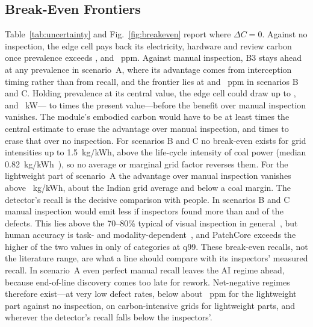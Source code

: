 \subsection{Break-Even Frontiers}
\label{sec:breakeven}
Table~\ref{tab:uncertainty} and Fig.~\ref{fig:breakeven} report where $\Delta C=0$. Against no inspection, the edge cell pays back its electricity, hardware and review carbon once prevalence exceeds \PrecPiStarNZero, \MetalPiStarNZero{} and \HiValPiStarNZero~ppm. Against manual inspection, B3 stays ahead at any prevalence in scenario~A, where its advantage comes from interception timing rather than from recall, and the frontier lies at \MetalPiStarLZero{} and \HiValPiStarLZero~ppm in scenarios B and C. Holding prevalence at its central value, the edge cell could draw up to \PrecCellPowerStar, \MetalCellPowerStar{} and \HiValCellPowerStar~kW---\PrecCellHeadroom{} to \HiValCellHeadroom{} times the present value---before the benefit over manual inspection vanishes. The module's embodied carbon would have to be at least \HwStarMultLZeroMin{} times the central estimate to erase the advantage over manual inspection, and \HwStarMultNZeroMin{} times to erase that over no inspection. For scenarios B and C no break-even exists for grid intensities up to 1.5~kg/kWh, above the life-cycle intensity of coal power (median 0.82~kg/kWh~\cite{schlomer2014annex}), so no average or marginal grid factor reverses them. For the lightweight part of scenario~A the advantage over manual inspection vanishes above \PrecGammaStar~kg/kWh, about the Indian grid average and below a coal margin. The detector's recall is the decisive comparison with people. In scenarios B and C manual inspection would emit less if inspectors found more than \MetalManualRecallStar{} and \HiValManualRecallStar{} of the defects. This lies above the 70--80\% typical of visual inspection in general~\cite{see2012visual}, but human accuracy is task- and modality-dependent~\cite{aust2021comparison}, and PatchCore exceeds the higher of the two values in only \DetAboveManualStar{} of \DetCategories{} categories at q99. These break-even recalls, not the literature range, are what a line should compare with its inspectors' measured recall. In scenario~A even perfect manual recall leaves the AI regime ahead, because end-of-line discovery comes too late for rework. Net-negative regimes therefore exist---at very low defect rates, below about \PrecPiStarNZero~ppm for the lightweight part against no inspection, on carbon-intensive grids for lightweight parts, and wherever the detector's recall falls below the inspectors'.


